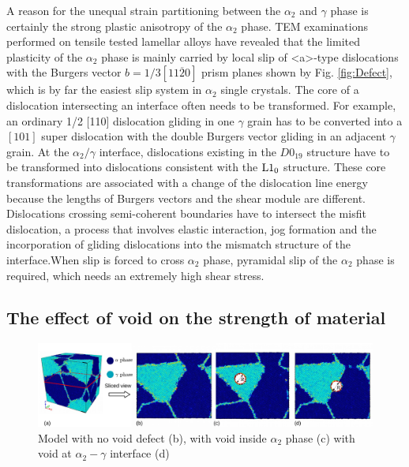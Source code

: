 \documentclass[metals,article,submit,moreauthors,pdftex,10pt,a4paper]{Definitions/mdpi}
\begin{document}
A reason for the unequal strain partitioning between the $\alpha_2$ and $\gamma$ phase is certainly the strong plastic anisotropy of the $\alpha_2$ phase. TEM examinations performed on tensile tested lamellar alloys have revealed that the limited plasticity of the $\alpha_2$ phase is mainly carried by local slip of <a>-type dislocations with the Burgers vector $b=1/3[11\overline{2}0]$ prism planes shown by Fig. \ref{fig:Defect}, which is by far the easiest slip system in $\alpha_2$ single crystals.  The core of a dislocation intersecting an interface often needs to be transformed. For example, an ordinary 1/2 [110] dislocation gliding in one $\gamma$ grain has to be converted into a $[101]$ super dislocation with the double Burgers vector gliding in an adjacent $\gamma$ grain. At the $\alpha_2/\gamma$ interface, dislocations existing in the $D0_{19}$ structure have to be transformed into dislocations consistent with the $\rm{L1_0}$ structure. These core transformations are associated with a change of the dislocation line energy because the lengths of Burgers vectors and the shear module are different. Dislocations crossing semi-coherent boundaries have to intersect the misfit dislocation, a process that involves elastic interaction, jog formation and the incorporation of gliding dislocations into the mismatch structure of the interface.When slip is forced to cross $\alpha_2$ phase, pyramidal slip of the $\alpha_2$ phase is required, which needs an extremely high shear stress.


\subsection{The effect of void on the strength of material}

\begin{figure}[ht]
	\centeringz
	\includegraphics[width=1\linewidth]{img/slice-view}
	\caption{ Model with no void defect (b), with void inside $\alpha_2$ phase (c) with void at $\alpha_2-\gamma$ interface (d)}
	\label{fig:model-creation}
\end{figure}
\end{document}
